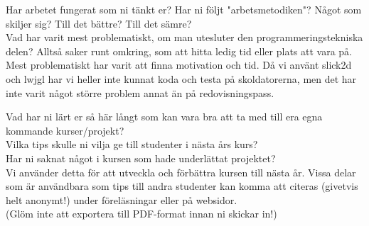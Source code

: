 {Har arbetet fungerat som ni tänkt er? Har ni följt "arbetsmetodiken"? Något som skiljer sig? Till det bättre? Till det sämre?\\
Vad har varit mest problematiskt, om man utesluter den programmeringstekniska delen? Alltså saker runt omkring, som att hitta ledig tid eller plats att vara på.\\

Mest problematiskt har varit att finna motivation och tid. Då vi använt slick2d och lwjgl har vi heller inte kunnat koda och testa på skoldatorerna, men det har inte varit något större problem annat än på redovisningspass.

Vad har ni lärt er så här långt som kan vara bra att ta med till era egna kommande kurser/projekt?\\
Vilka tips skulle ni vilja ge till studenter i nästa års kurs?\\
Har ni saknat något i kursen som hade underlättat projektet?\\
\vspace{11pt}
Vi använder detta för att utveckla och förbättra kursen till nästa år.  Vissa delar som är användbara som tips till andra studenter kan komma att citeras (givetvis helt anonymt!) under föreläsningar eller på websidor.\\
(Glöm inte att exportera till PDF-format innan ni skickar in!)\\}
